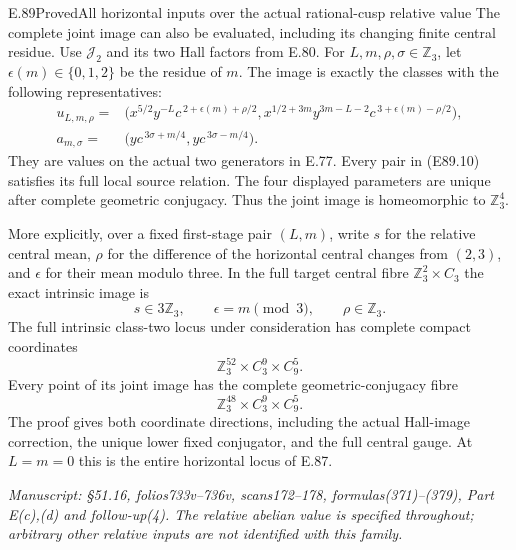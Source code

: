 \begin{statement}{E.89}{Proved}{All horizontal inputs over the actual rational-cusp relative value}
The complete joint image can also be evaluated,
including its changing finite central residue.
Use $\mathcal J_2$ and its two Hall factors from
E.80. For $L,m,\rho,\sigma\in\mathbb Z_3$, let
$\epsilon(m)\in\{0,1,2\}$ be the residue of $m$.
The image is exactly the classes with the following
representatives:
\[
 \begin{aligned}
 u_{L,m,\rho}={}&
 \bigl(x^{5/2}y^{-L}c^{\,2+\epsilon(m)+\rho/2},
       x^{1/2+3m}y^{3m-L-2}
                    c^{\,3+\epsilon(m)-\rho/2}\bigr),\\
 a_{m,\sigma}={}&
       \bigl(yc^{\,3\sigma+m/4},
             yc^{\,3\sigma-m/4}\bigr).
 \end{aligned}
 \tag{E89.10}
\]
They are values on the actual two generators
in E.77. Every pair in (E89.10) satisfies its
full local source relation. The four displayed
parameters are unique after complete geometric
conjugacy. Thus the joint image is homeomorphic
to $\mathbb Z_3^4$.

More explicitly, over a fixed first-stage pair
$(L,m)$, write $s$ for the relative central mean,
$\rho$ for the difference of the horizontal
central changes from $(2,3)$, and $\epsilon$ for
their mean modulo three. In the full target
central fibre $\mathbb Z_3^2\times C_3$ the exact
intrinsic image is
\[
             s\in3\mathbb Z_3,\qquad
             \epsilon=m\pmod3,
             \qquad\rho\in\mathbb Z_3.
 \tag{E89.11}
\]
The full intrinsic class-two locus under
consideration has complete compact coordinates
\[
       \mathbb Z_3^{52}\times C_3^9\times C_9^5.
 \tag{E89.12}
\]
Every point of its joint image has the complete
geometric-conjugacy fibre
\[
       \mathbb Z_3^{48}\times C_3^9\times C_9^5.
 \tag{E89.13}
\]
The proof gives both coordinate directions,
including the actual Hall-image correction,
the unique lower fixed conjugator, and the full
central gauge. At $L=m=0$ this is the entire
horizontal locus of E.87.

\emph{Manuscript: \S51.16, folios733v--736v,
scans172--178, formulas(371)--(379), Part E(c),(d)
and follow-up(4). The relative abelian value is
specified throughout; arbitrary other relative
inputs are not identified with this family.}
\end{statement}

